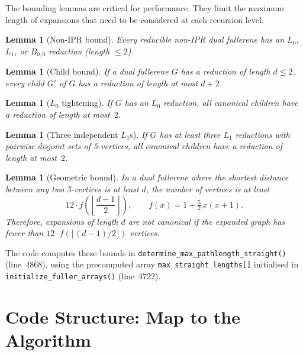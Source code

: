\documentclass[11pt,a4paper]{article}
\newtheorem{lemma}[theorem]{Lemma}
\theoremstyle{definition}
\begin{document}
The bounding lemmas are critical for performance.  They limit the
maximum length of expansions that need to be considered at each
recursion level.

\begin{lemma}[Non-IPR bound]\label{lem:nonipr}
Every reducible non-IPR dual fullerene has an $L_0$, $L_1$, or
$B_{0,0}$ reduction (length $\le 2$).
\end{lemma}

\begin{lemma}[Child bound]\label{lem:child}
If a dual fullerene $G$ has a reduction of length $d \le 2$, every
child $G'$ of $G$ has a reduction of length at most $d + 2$.
\end{lemma}

\begin{lemma}[$L_0$ tightening]\label{lem:L0}
If $G$ has an $L_0$ reduction, all \emph{canonical} children have a
reduction of length at most~$2$.
\end{lemma}

\begin{lemma}[Three independent $L_1$s]\label{lem:3L1}
If $G$ has at least three $L_1$ reductions with pairwise disjoint sets
of 5-vertices, all canonical children have a reduction of length at
most~$2$.
\end{lemma}

\begin{lemma}[Geometric bound]\label{lem:geometric}
In a dual fullerene where the shortest distance between any two
5-vertices is at least $d$, the number of vertices is at least
\[
  12 \cdot f\!\left(\left\lfloor \frac{d-1}{2} \right\rfloor\right),
  \qquad
  f(x) = 1 + \tfrac{5}{2}\, x(x+1).
\]
Therefore, expansions of length $d$ are not canonical if the expanded
graph has fewer than $12 \cdot f(\lfloor(d-1)/2\rfloor)$ vertices.
\end{lemma}

The code computes these bounds in
\texttt{determine\_max\_pathlength\_straight()} (line~4868), using the
precomputed array \texttt{max\_straight\_lengths[]} initialised in
\texttt{initialize\_fuller\_arrays()} (line~4722).

\section{Code Structure: Map to the Algorithm}
\label{sec:codemap}
\end{document}
